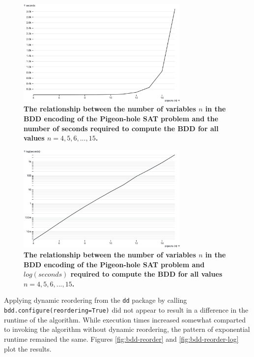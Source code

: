 \documentclass{article}
\newcommand{\code}[1]{\texttt{#1}}
\begin{document}
\begin{figure}
  \centering
  \includegraphics[width=0.75\textwidth]{bdd}
  \caption{\textbf{The relationship between the number of variables $n$ in the BDD encoding of the Pigeon-hole SAT problem and the number of seconds required to compute the BDD for all values $n = 4, 5, 6,...,15$.}}
  \label{fig:bdd-pigeon-hole}
\end{figure}

\begin{figure}
  \centering
  \includegraphics[width=0.75\textwidth]{bdd-log}
  \caption{\textbf{The relationship between the number of variables $n$ in the BDD encoding of the Pigeon-hole SAT problem and $log(seconds)$ required to compute the BDD for all values $n = 4, 5, 6,...,15$.}}
  \label{fig:bdd-pigeon-hole-log}
\end{figure}

\medskip
\noindent Applying dynamic reordering from the \code{dd} package by calling \code{bdd.configure(reordering=True)} did not appear to result in a difference in the runtime of the algorithm. While execution times increased somewhat comparted to invoking the algorithm without dynamic reordering, the pattern of exponential runtime remained the same. Figures \ref{fig:bdd-reorder} and \ref{fig:bdd-reorder-log} plot the results.
\end{document}
